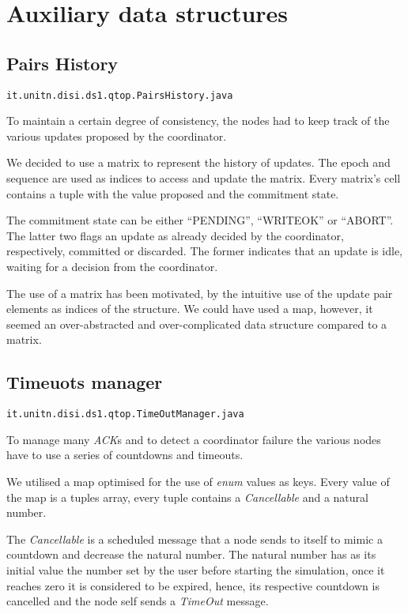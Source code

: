 \section{Auxiliary data structures}


\subsection{Pairs History}\label{subsec:pairshostory}

\texttt{it.unitn.disi.ds1.qtop.PairsHistory.java}

To maintain a certain degree of consistency, the nodes had to keep track of the various updates proposed by the coordinator.

We decided to use a matrix to represent the history of updates. The epoch and sequence are used as indices to access and update the matrix. Every matrix's cell contains a tuple with the value proposed and the commitment state.

The commitment state can be either ``PENDING'', ``WRITEOK'' or ``ABORT''. The latter two flags an update as already decided by the coordinator, respectively, committed or discarded. The former indicates that an update is idle, waiting for a decision from the coordinator.

The use of a matrix has been motivated, by the intuitive use of the update pair elements as indices of the structure. We could have used a map, however, it seemed an over-abstracted and over-complicated data structure compared to a matrix.

\subsection{Timeuots manager}

\texttt{it.unitn.disi.ds1.qtop.TimeOutManager.java}

To manage many \textit{ACK}s and to detect a coordinator failure the various nodes have to use a series of countdowns and timeouts. 

We utilised a map optimised for the use of \textit{enum} values as keys. Every value of the map is a tuples array, every tuple contains a \textit{Cancellable} and a natural number.

The \textit{Cancellable} is a scheduled message that a node sends to itself to mimic a countdown and decrease the natural number. The natural number has as its initial value the number set by the user before starting the simulation, once it reaches zero it is considered to be expired, hence, its respective countdown is cancelled and the node self sends a \textit{TimeOut} message.


